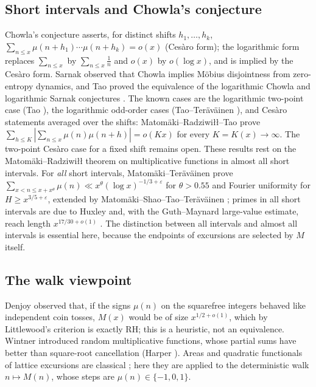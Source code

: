 \documentclass[11pt,reqno]{amsart}
\makeatletter
\let\CG@origcite\cite
\renewcommand*{\cite}[2][]{\def\CG@citekey{#2}%
  \ifx\relax#1\relax\CG@origcite{#2}\else\CG@origcite[#1]{#2}\fi}
\numberwithin{equation}{section}
\theoremstyle{plain}
\theoremstyle{definition}
\theoremstyle{remark}
\newcommand{\eps}{\varepsilon}
\makeatother
\begin{document}
\subsection{Short intervals and Chowla's conjecture}
\label{subsec:intro-chowla}
Chowla's conjecture \cite{Chowla1965} asserts, for distinct shifts
$h_1,\dots,h_k$, $\sum_{n\le x}\mu(n+h_1)\cdots\mu(n+h_k)=o(x)$ (Cesàro form);
the logarithmic form replaces $\sum_{n\le x}$ by $\sum_{n\le x}\frac1n$ and
$o(x)$ by $o(\log x)$, and is implied by the Cesàro form. Sarnak
\cite{Sarnak2010} observed that Chowla implies Möbius disjointness from
zero-entropy dynamics, and Tao proved the equivalence of the logarithmic
Chowla and logarithmic Sarnak conjectures \cite{Tao2017}. The known cases
are the logarithmic two-point case (Tao \cite{Tao2016}), the logarithmic
odd-order cases (Tao--Teräväinen \cite{TaoTeravainen2018,TaoTeravainen2019}),
and Cesàro statements averaged over the shifts: Matomäki--Radziwiłł--Tao
\cite{MRT15} prove $\sum_{h\le K}|\sum_{n\le x}\mu(n)\mu(n+h)|=o(Kx)$ for
every $K=K(x)\to\infty$. The two-point Cesàro case for a fixed shift remains
open. These results rest on the Matomäki--Radziwiłł theorem \cite{MR16} on
multiplicative functions in almost all short intervals. For \emph{all}
short intervals, Matomäki--Teräväinen \cite{MatomakiTeravainen2023} prove
$\sum_{x<n\le x+x^\theta}\mu(n)\ll x^\theta(\log x)^{-1/3+\eps}$ for
$\theta>0.55$ and Fourier uniformity for $H\ge x^{3/5+\eps}$, extended by
Matomäki--Shao--Tao--Teräväinen \cite{MSTT23}; primes in all short intervals
are due to Huxley \cite{Huxley1972} and, with the Guth--Maynard large-value
estimate, reach length $x^{17/30+o(1)}$ \cite{GuthMaynard2026}. The
distinction between all intervals and almost all intervals is essential
here, because the endpoints of excursions are selected by $M$ itself.

\subsection{The walk viewpoint}
\label{subsec:intro-walk}
Denjoy \cite{Denjoy1931} observed that, if the signs $\mu(n)$ on the
squarefree integers behaved like independent coin tosses, $M(x)$ would be
of size $x^{1/2+o(1)}$, which by Littlewood's criterion is exactly RH; this
is a heuristic, not an equivalence. Wintner \cite{Wintner1944} introduced
random multiplicative functions, whose partial sums have better than
square-root cancellation (Harper \cite{Harper2020}). Areas and quadratic
functionals of lattice excursions are classical
\cite{Takacs91,NguyenThe04,Richard05,Janson07,DKW15,CP17}; here they are
applied to the deterministic walk $n\mapsto M(n)$, whose steps are
$\mu(n)\in\{-1,0,1\}$.
\end{document}
